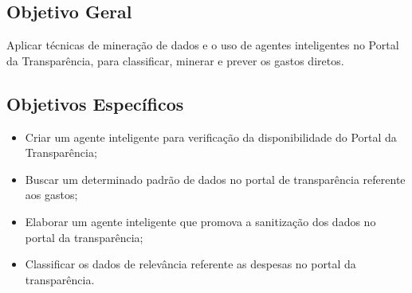 \subsection{Objetivo Geral }
Aplicar técnicas de mineração de dados e o uso de agentes inteligentes no Portal da Transparência, para classificar, minerar e prever os gastos diretos. 

\begin{comment}
Este é um comentário
\end{comment}

\subsection{Objetivos Específicos}
\begin{itemize}
\item Criar um agente inteligente para verificação da disponibilidade do Portal da Transparência; 

\item Buscar um determinado padrão de dados no portal de transparência referente aos gastos; 

\item Elaborar um agente inteligente que promova a sanitização dos dados no portal da transparência; 

\item Classificar os dados de relevância referente as despesas no portal da transparência. 

\end{itemize}
